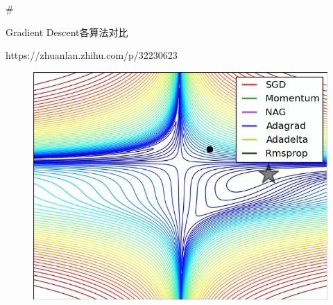 \documentclass[11pt]{article}
\makeatletter
\def\maxwidth{\ifdim\Gin@nat@width>\linewidth\linewidth
    \else\Gin@nat@width\fi}
\let\Oldincludegraphics\includegraphics
\renewcommand{\includegraphics}[1]{\Oldincludegraphics[width=.8\maxwidth]{#1}}
\makeatother
\begin{document}
    \#

Gradient Descent各算法对比

https://zhuanlan.zhihu.com/p/32230623

\begin{figure}
\centering
\includegraphics{_adag.gif}
\caption{}
\end{figure}
\end{document}
